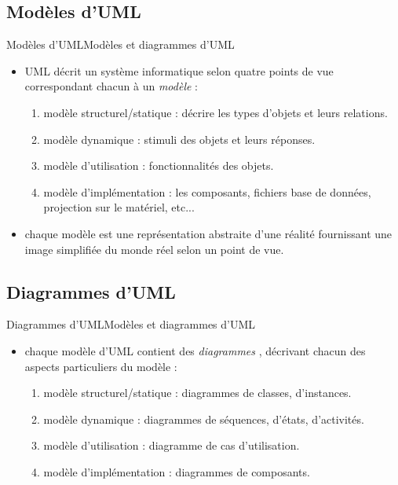 \documentclass{beamer}
\begin{document}
  \subsection{Modèles d'UML}
    \begin{frame}{Modèles d'UML}{Modèles et diagrammes d'UML}
      \begin{itemize}
        \item{UML décrit un système informatique selon quatre points de vue correspondant chacun à un \og \textit{modèle} \fg{} : \pause}
        \begin{enumerate}
          \item{modèle structurel/statique : décrire les types d'objets et leurs relations.\pause}
          \item{modèle dynamique : stimuli des objets et leurs réponses.\pause}
          \item{modèle d'utilisation : fonctionnalités des objets.\pause}
          \item{modèle d'implémentation : les composants, fichiers base de données, projection sur le matériel, etc...\pause}
        \end{enumerate}
        \item<2->{chaque modèle est une représentation abstraite d'une réalité fournissant une image simplifiée du monde réel selon un point de vue.}
      \end{itemize}
    \end{frame}

  \subsection{Diagrammes d'UML}
    \begin{frame}{Diagrammes d'UML}{Modèles et diagrammes d'UML}
      \begin{itemize}
        \item{chaque modèle d'UML contient des \og \textit{diagrammes} \fg{}, décrivant chacun des aspects particuliers du modèle : \pause}
        \begin{enumerate}
          \item{modèle structurel/statique : diagrammes de classes, d'instances.\pause}
          \item{modèle dynamique : diagrammes de séquences, d'états, d'activités.\pause}
          \item{modèle d'utilisation : diagramme de cas d'utilisation.\pause}
          \item{modèle d'implémentation : diagrammes de composants.}
        \end{enumerate}
      \end{itemize}
    \end{frame}
\end{document}

